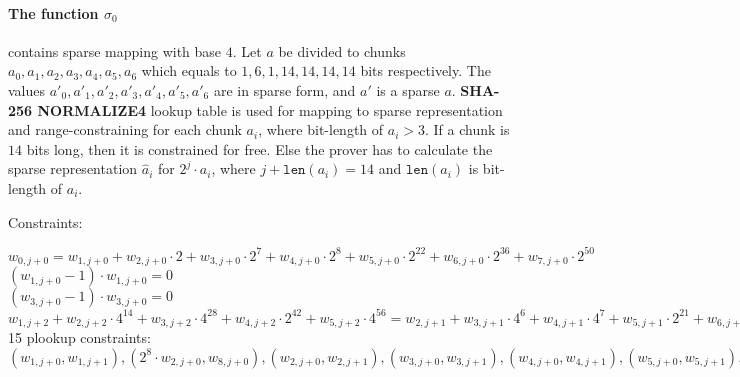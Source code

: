 \paragraph{The function $\sigma_0$} contains sparse mapping with base $4$.
Let $a$ be divided to chunks $a_0, a_1, a_2, a_3, a_4, a_5, a_6$ which equals to $1, 6, 1, 14, 14, 14, 14$ bits respectively.
The values $a'_0, a'_1, a'_2, a'_3, a'_4, a'_5, a'_6$ are in sparse form, and $a'$ is a sparse $a$.
\textbf{SHA-256 NORMALIZE4} lookup table is used for mapping to sparse representation and range-constraining for each chunk $a_i$, where bit-length of $a_i > 3$.
If a chunk is $14$ bits long, then it is constrained for free.
Else the prover has to calculate the sparse representation $\hat{a}_i$ for $2^j \cdot a_i$, where $j + \texttt{len}(a_i) = 14$ and $\texttt{len}(a_i)$ is bit-length of $a_i$.

Constraints:
\begin{center}
    $w_{0, j + 0} = w_{1, j + 0} + w_{2,j + 0} \cdot 2 + w_{3,j + 0} \cdot 2^{7} + w_{4, j + 0} \cdot 2^{8} + w_{5, j + 0} \cdot 2^{22} + w_{6,  j + 0}\cdot 2^{36} + w_{7, j + 0} \cdot 2^{50}$ \\
    $(w_{1, j + 0} - 1) \cdot w_{1, j + 0} = 0$ \\
    $(w_{3, j + 0} - 1) \cdot w_{3, j + 0} = 0$ \\
    $w_{1, j + 2} + w_{2, j + 2} \cdot 4^{14} + w_{3, j + 2} \cdot 4^{28} + w_{4, j + 2} \cdot 2^{42} + w_{5, j + 2} \cdot 4^{56} = w_{2, j + 1} + w_{3, j + 1} \cdot 4^6 + w_{4, j + 1} \cdot 4^{7} + w_{5, j + 1} \cdot 2^{21} + w_{6, j + 1} \cdot 4^{35} + w_{7, j + 1} \cdot 4^{49} + w_{1, j + 1} \cdot 4^{63} + 
     w_{3, j + 1} + w_{4, j + 1} \cdot 4 + w_{5, j + 1} \cdot 4^{15} + w_{6, j + 1} \cdot 2^{29} + w_{7, j + 1} \cdot 4^{43} + 
     w_{4, j + 1} + w_{5, j + 1} \cdot 4^{14} + w_{6, j + 1} \cdot 4^{28} + w_{7, j + 1} \cdot 2^{42} + w_{1, j + 1} \cdot 4^{56} + w_{2, j + 1} \cdot 4^{57} + w_{3, j + 1} \cdot 4^{63}$ \\
    15 plookup constraints: $(w_{1, j + 0}, w_{1, j + 1}), ( 2^{8} \cdot w_{2, j + 0}, w_{8, j + 0}), (w_{2, j + 0}, w_{2, j + 1}), (w_{3, j + 0}, w_{3, j + 1}), (w_{4, j + 0}, w_{4, j + 1}), (w_{5, j + 0}, w_{5, j + 1}),  (w_{6, j + 0}, w_{6, j + 1}),  (w_{7, j + 0}, w_{7, j + 1}), (w_{1, j + 3}, w_{1, j + 2}), (w_{2, j + 3}, w_{2, j + 2}), (w_{3, j + 3}, w_{3, j + 2}), (w_{4, j + 3}, w_{4, j + 2}), (w_{5, j + 3}, w_{5, j + 2}), (2^6 \cdot w_{5, j + 3}, w_{6, j + 2})$
\end{center}

